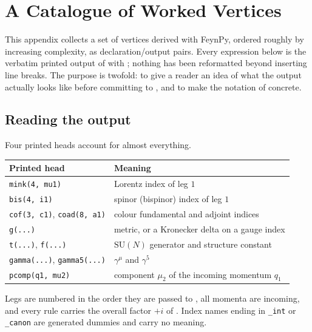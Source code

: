 
\chapter{A Catalogue of Worked Vertices}
\label{app:examples}

This appendix collects a set of vertices derived with FeynPy, ordered
roughly by increasing complexity, as declaration/output pairs. Every
expression below is the verbatim printed output of 
with ; nothing has been reformatted beyond inserting line
breaks. The purpose is twofold: to give a reader an idea of what the output
actually looks like before committing to , and to make the
notation of  concrete.

\section*{Reading the output}

Four printed heads account for almost everything.

\begin{center}
\begin{tabular}{@{}P{4.3cm}p{7.2cm}@{}}
\toprule
\normalfont\textbf{Printed head} & \textbf{Meaning} \\
\midrule
\texttt{mink(4, mu1)}   & Lorentz index of leg $1$ \\
\texttt{bis(4, i1)}     & spinor (bispinor) index of leg $1$ \\
\texttt{cof(3, c1)}, \texttt{coad(8, a1)} & colour fundamental and adjoint indices \\
\texttt{g(...)}         & metric, or a Kronecker delta on a gauge index \\
\texttt{t(...)}, \texttt{f(...)} & $\mathrm{SU}(N)$ generator and structure constant \\
\texttt{gamma(...)}, \texttt{gamma5(...)} & $\gamma^\mu$ and $\gamma^5$ \\
\texttt{pcomp(q1, mu2)} & component $\mu_2$ of the incoming momentum $q_1$ \\
\bottomrule
\end{tabular}
\end{center}

\noindent Legs are numbered in the order they are passed to
, all momenta are incoming, and every rule carries the
overall factor $+i$ of . Index names ending in
\texttt{\_int} or \texttt{\_canon} are generated dummies and carry no
meaning.

